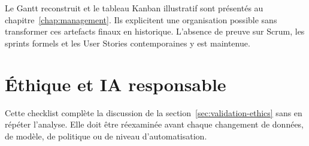 \documentclass[11pt,a4paper,oneside]{report}
\theoremstyle{definition}
\theoremstyle{plain}
\begin{document}
Le Gantt reconstruit et le tableau Kanban illustratif sont présentés au
chapitre~\ref{chap:management}. Ils explicitent une organisation possible
sans transformer ces artefacts finaux en historique. L'absence de preuve sur
Scrum, les sprints formels et les User Stories contemporaines y est maintenue.
\label{fig:app-gantt}

\chapter{Éthique et IA responsable}
\label{app:ethics}

Cette checklist complète la discussion de la
section~\ref{sec:validation-ethics} sans en répéter l'analyse. Elle doit être
réexaminée avant chaque changement de données, de modèle, de politique ou de
niveau d'automatisation.
\end{document}
